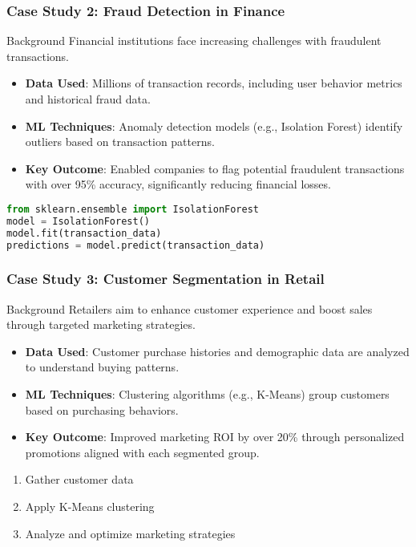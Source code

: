 \documentclass[aspectratio=169]{beamer}
\begin{document}
\begin{frame}[fragile]
    \frametitle{Case Study 2: Fraud Detection in Finance}
    \begin{block}{Background}
        Financial institutions face increasing challenges with fraudulent transactions.
    \end{block}
    
    \begin{itemize}
        \item \textbf{Data Used}: Millions of transaction records, including user behavior metrics and historical fraud data.
        \item \textbf{ML Techniques}: Anomaly detection models (e.g., Isolation Forest) identify outliers based on transaction patterns.
        \item \textbf{Key Outcome}: Enabled companies to flag potential fraudulent transactions with over 95\% accuracy, significantly reducing financial losses.
    \end{itemize}
    
    \begin{lstlisting}[language=Python]
from sklearn.ensemble import IsolationForest
model = IsolationForest()
model.fit(transaction_data)
predictions = model.predict(transaction_data)
    \end{lstlisting}
\end{frame}

\begin{frame}[fragile]
    \frametitle{Case Study 3: Customer Segmentation in Retail}
    \begin{block}{Background}
        Retailers aim to enhance customer experience and boost sales through targeted marketing strategies.
    \end{block}
    
    \begin{itemize}
        \item \textbf{Data Used}: Customer purchase histories and demographic data are analyzed to understand buying patterns.
        \item \textbf{ML Techniques}: Clustering algorithms (e.g., K-Means) group customers based on purchasing behaviors.
        \item \textbf{Key Outcome}: Improved marketing ROI by over 20\% through personalized promotions aligned with each segmented group.
    \end{itemize}
    
    \begin{enumerate}
        \item Gather customer data
        \item Apply K-Means clustering
        \item Analyze and optimize marketing strategies
    \end{enumerate}
\end{frame}
\end{document}

